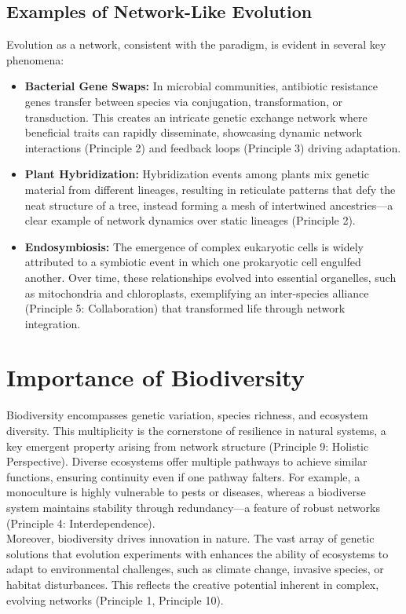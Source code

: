 \subsection{Examples of Network-Like Evolution}
Evolution as a network, consistent with the paradigm, is evident in several key phenomena:
\begin{itemize}
    \item \textbf{Bacterial Gene Swaps:} In microbial communities, antibiotic resistance genes transfer between species via conjugation, transformation, or transduction. This creates an intricate genetic exchange network where beneficial traits can rapidly disseminate, showcasing dynamic network interactions (Principle 2) and feedback loops (Principle 3) driving adaptation.
    \item \textbf{Plant Hybridization:} Hybridization events among plants mix genetic material from different lineages, resulting in reticulate patterns that defy the neat structure of a tree, instead forming a mesh of intertwined ancestries—a clear example of network dynamics over static lineages (Principle 2).
    \item \textbf{Endosymbiosis:} The emergence of complex eukaryotic cells is widely attributed to a symbiotic event in which one prokaryotic cell engulfed another. Over time, these relationships evolved into essential organelles, such as mitochondria and chloroplasts, exemplifying an inter-species alliance (Principle 5: Collaboration) that transformed life through network integration.
\end{itemize} %

\section{Importance of Biodiversity}
Biodiversity encompasses genetic variation, species richness, and ecosystem diversity. This multiplicity is the cornerstone of resilience in natural systems, a key emergent property arising from network structure (Principle 9: Holistic Perspective). Diverse ecosystems offer multiple pathways to achieve similar functions, ensuring continuity even if one pathway falters. For example, a monoculture is highly vulnerable to pests or diseases, whereas a biodiverse system maintains stability through redundancy—a feature of robust networks (Principle 4: Interdependence).\\[1ex]
Moreover, biodiversity drives innovation in nature. The vast array of genetic solutions that evolution experiments with enhances the ability of ecosystems to adapt to environmental challenges, such as climate change, invasive species, or habitat disturbances. This reflects the creative potential inherent in complex, evolving networks (Principle 1, Principle 10). %

